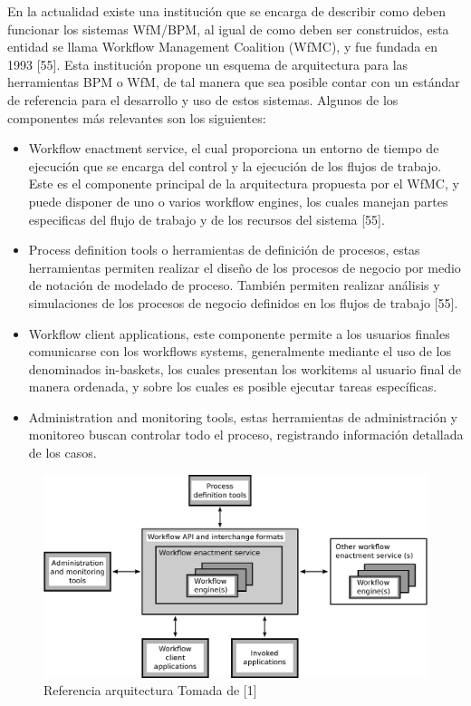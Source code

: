 En la actualidad existe una institución que se encarga de describir como deben funcionar los sistemas WfM/BPM, al igual de como deben ser construidos, esta entidad se llama Workflow Management Coalition (WfMC), y fue fundada en 1993 [55]. Esta institución propone un esquema de arquitectura para las herramientas BPM o WfM, de tal manera que sea posible contar con un estándar de referencia para el desarrollo y uso de estos sistemas. Algunos de los componentes más relevantes son los siguientes: 

\begin{itemize}
    \item Workflow enactment service, el cual proporciona un entorno de tiempo de ejecución que se encarga del control y la ejecución de los flujos de trabajo. Este es el componente principal de la arquitectura propuesta por el WfMC,  y puede disponer de uno o varios workflow engines, los cuales manejan partes especificas del flujo de trabajo y de los recursos del sistema [55]. 
    
    \item Process definition tools o herramientas de definición de procesos, estas herramientas permiten realizar el diseño de los procesos de negocio por medio de notación de modelado de proceso. También permiten realizar análisis y simulaciones de los procesos de negocio definidos en los flujos de trabajo [55]. 
    
    \item Workflow client applications, este componente permite a los usuarios finales comunicarse con los workflows systems, generalmente mediante el uso de los denominados in-baskets, los cuales presentan los workitems al usuario final de manera ordenada, y sobre los cuales es posible ejecutar tareas específicas.
    
    \item Administration and monitoring tools, estas herramientas de administración y monitoreo buscan controlar todo el proceso, registrando información detallada de los casos.
    
\end{itemize}

\begin{figure}[htbp!] 
\centering    
\includegraphics[width=1.0\textwidth]{Chapter1/Figs/Figure_referenceWfMC}
\caption[ReferenceWfMC]{Referencia arquitectura Tomada de [1]}
\label{fig:ReferenceWfMC}
\end{figure}

